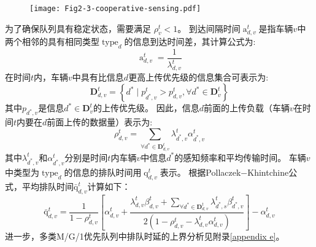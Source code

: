 \begin{figure}[h]
\centering
  \texttt{[image: Fig2-3-cooperative-sensing.pdf]}
  \label{fig 2-3}
\end{figure}

为了确保队列具有稳定状态，需要满足 $\rho_{v}^{t} < 1$。
到达间隔时间$\operatorname{a}_{d, v}^t$是指车辆$v$中两个相邻的具有相同类型$\operatorname{type}_d$的信息到达时间差，其计算公式为:
\begin{equation}
    \operatorname{a}_{d, v}^t=\frac{1}{\lambda_{d, v}^{t}}
\end{equation}
在时间$t$内，车辆$v$中具有比信息$d$更高上传优先级的信息集合可表示为:
\begin{equation}
\mathbf{D}_{d, v}^t=\left\{d^* \mid p_{d^*, v}^t>p_{d, v}^t, \forall d^* \in \mathbf{D}_v^t\right\} 
\end{equation}
其中$p_{d^*, v}$是信息$d^* \in \mathbf{D}_v^t$的上传优先级。
  因此，信息$d$前面的上传负载（车辆$v$在时间$t$内要在$d$前面上传的数据量）表示为:
\begin{equation}
\rho_{d, v}^t=\sum_{\forall d^* \in \mathbf{D}_{d, v}^t} \lambda_{d^*, v}^t \alpha_{d^*, v}^t
\end{equation}
其中$\lambda_{d^*, v}^t$和$\alpha_{d^*, v}^t$分别是时间$t$内车辆$v$中信息$d^*$的感知频率和平均传输时间。
车辆$v$中类型为$\operatorname{type}_d$的信息的排队时间用$\operatorname{q}_{d, v}^t$表示。
根据Pollaczek$-$Khintchine公式\cite{takine2001queue}，平均排队时间$\operatorname{\bar{q}}_{d, v}^t$计算如下：
\begin{equation}
    \operatorname{\bar{q}}_{d, v}^t= \frac{1} {1 - \rho_{d, v}^{t}} 
        \left[ \alpha_{d, v}^t + \frac{ \lambda_{d, v}^{t} \beta_{d, v}^t + \sum\limits_{\forall d^* \in \mathbf{D}_{d, v}^t} \lambda_{d^*,s}^t \beta_{d^*, v}^t }{2\left(1-\rho_{d, v}^{t} - \lambda_{d, v}^{t}  \alpha_{d, v}^t\right)}\right] 
        - \alpha_{d, v}^t
\label{equ 2-6}
\end{equation}
进一步，多类M/G/1优先队列中排队时延的上界分析见附录\ref{appendix e}。

